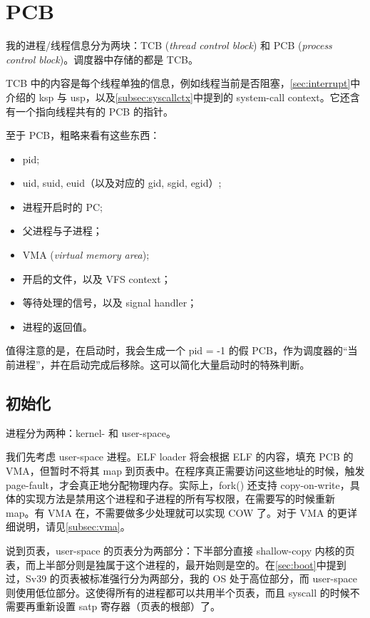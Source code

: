 \section{PCB}
\label{sec:pcb}

我的进程/线程信息分为两块：TCB (\textit{thread control block}) 和 PCB (\textit{process control block})。调度器中存储的都是 TCB。

TCB 中的内容是每个线程单独的信息，例如线程当前是否阻塞，\cref{sec:interrupt}中介绍的 ksp 与 usp，以及\cref{subsec:syscallctx}中提到的 system-call context。它还含有一个指向线程共有的 PCB 的指针。

至于 PCB，粗略来看有这些东西：
\begin{itemize}
\item pid;
\item uid, suid, euid（以及对应的 gid, sgid, egid）;
\item 进程开启时的 PC;
\item 父进程与子进程；
\item VMA (\textit{virtual memory area});
\item 开启的文件，以及 VFS context；
\item 等待处理的信号，以及 signal handler；
\item 进程的返回值。
\end{itemize}

值得注意的是，在启动时，我会生成一个 pid = -1 的假 PCB，作为调度器的“当前进程”，并在启动完成后移除。这可以简化大量启动时的特殊判断。

\subsection{初始化}
\label{subsec:pcbinit}

进程分为两种：kernel- 和 user-space。

我们先考虑 user-space 进程。ELF loader 将会根据 ELF 的内容，填充 PCB 的 VMA，但暂时不将其 map 到页表中。在程序真正需要访问这些地址的时候，触发 page-fault，才会真正地分配物理内存。实际上，fork() 还支持 copy-on-write，具体的实现方法是禁用这个进程和子进程的所有写权限，在需要写的时候重新 map。有 VMA 在，不需要做多少处理就可以实现 COW 了。对于 VMA 的更详细说明，请见\cref{subsec:vma}。

说到页表，user-space 的页表分为两部分：下半部分直接 shallow-copy 内核的页表，而上半部分则是独属于这个进程的，最开始则是空的。在\cref{sec:boot}中提到过，Sv39 的页表被标准强行分为两部分，我的 OS 处于高位部分，而 user-space 则使用低位部分。这使得所有的进程都可以共用半个页表，而且 syscall 的时候不需要再重新设置 satp 寄存器（页表的根部）了。

